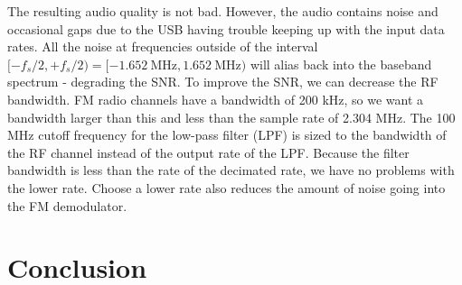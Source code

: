\documentclass{article}
\begin{document}
The resulting audio quality is not bad. However, the audio contains noise and occasional gaps due to the USB having trouble keeping up with the input data rates. All the noise at frequencies outside of the interval $[-f_s/2, +f_s/2) = [-1.652\ \text{MHz}, 1.652\ \text{MHz})$ will alias back into the baseband spectrum - degrading the SNR. To improve the SNR, we can decrease the RF bandwidth. FM radio channels have a bandwidth of 200 kHz, so we want a bandwidth larger than this and less than the sample rate of 2.304 MHz. The 100 MHz cutoff frequency for the low-pass filter (LPF) is sized to the bandwidth of the RF channel instead of the output rate of the LPF. Because the filter bandwidth is less than the rate of the decimated rate, we have no problems with the lower rate. Choose a lower rate also reduces the amount of noise going into the FM demodulator.

\section{Conclusion}

%
%
	
\end{document}
